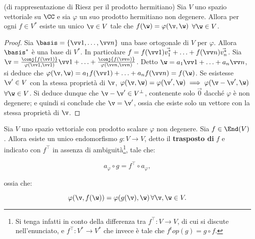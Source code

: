 \documentclass[11pt]{article}
\begin{document}
	\begin{theorem} (di rappresentazione di Riesz per il prodotto hermitiano)
		Sia $V$ uno spazio vettoriale su $\CC$ e sia $\varphi$ un suo prodotto hermitiano non
		degenere. Allora per ogni $f \in V^*$ esiste un unico $\v \in V$ tale che
		$f(\w) = \varphi(\v, \w)$ $\forall \w \in V$.
	\end{theorem}

	\begin{proof}
		Sia $\basis = \{ \vv 1, \ldots, \vv n \}$ una base ortogonale di $V$ per $\varphi$. Allora $\basis^*$ è una base di $V^*$. In
		particolare $f = f(\vv 1) \vec{v_1^*} + \ldots + f(\vv n) \vec{v_n^*}$. Sia $\v = \frac{\conj{f(\vv 1)}}{\varphi(\vv 1, \vv 1)} \vv 1 + \ldots + \frac{\conj{f(\vv n)}}{\varphi(\vv n, \vv n)}$. Detto $\w = a_1 \vv 1 + \ldots + a_n \vv n$,
		si deduce che $\varphi(\v, \w) = a_1 f(\vv 1) + \ldots + a_n f(\vv n) = f(\w)$. Se esistesse $\v' \in V$ con
		la stessa proprietà di $\v$, $\varphi(\v, \w) = \varphi(\v', \w) \implies \varphi(\v - \v', \w)$ $\forall \w \in V$. Si deduce dunque che $\v - \v' \in V^\perp$, contenente solo $\vec 0$ dacché $\varphi$ è non degenere;
		e quindi si conclude che $\v = \v'$, ossia che esiste solo un vettore con la stessa proprietà di $\v$.
	\end{proof}

	\begin{proposition}
		Sia $V$ uno spazio vettoriale con prodotto scalare $\varphi$ non degenere.
		Sia $f \in \End(V)$. Allora esiste un unico endomorfismo
		$g : V \to V$, detto il \textbf{trasposto di} $f$ e indicato con $f^\top$ in assenza
		di ambiguità\footnote{Si tenga infatti in conto della differenza tra $f^\top : V \to V$, di cui si discute
		nell'enunciato, e $f^\top : V^* \to V^*$ che invece è tale che $f^top(g) = g \circ f$.}, tale che:
		
		\[ a_\varphi \circ g = f^\top \circ a_\varphi, \]
		
		\vskip 0.05in
		
		ossia che:
		
		\[ \varphi(\v, f(\w)) = \varphi(g(\v), \w) \, \forall \v, \w \in V. \]
	\end{proposition}
	
\end{document}
